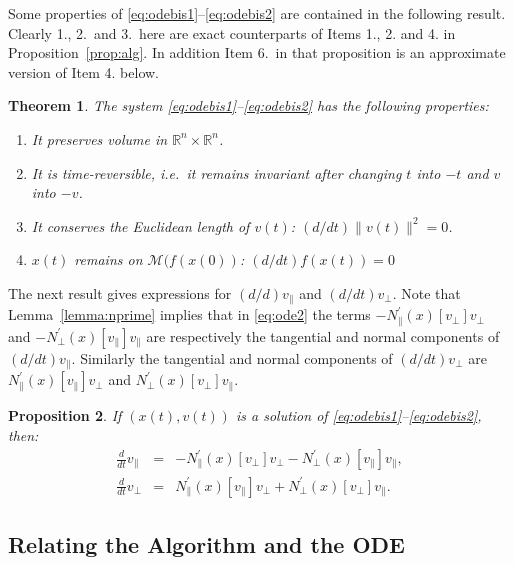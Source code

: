 \documentclass[10pt]{article}
\newcommand{\Npperp}{N^\prime_\perp}
\newcommand{\Nppar}{N^\prime_\|}
\newcommand{\bbR}{\mathbb R}
\newcommand{\vperp}{v_\perp}
\newcommand{\vpar}{v_\|}
\newtheorem{proposition}{Proposition}
\newtheorem{theorem}[proposition]{Theorem}
\begin{document}
Some properties of \eqref{eq:odebis1}--\eqref{eq:odebis2} are contained in the following result. Clearly 1., 2.\ and 3.\
here are exact counterparts of Items 1., 2. and 4. in Proposition~\ref{prop:alg}. In addition Item 6.\ in that proposition is an approximate version of Item 4. below.
\begin{theorem}\label{th:odebis}
The system \eqref{eq:odebis1}--\eqref{eq:odebis2} has the following properties:
\begin{enumerate}
\item It preserves volume in \(\bbR^n\times\bbR^n\).
\item It is time-reversible, i.e.\ it remains invariant after changing \(t\) into \(-t\) and \(v\) into \(-v\).
\item It conserves the Euclidean length of \(v(t)\): \((d/dt) \|v(t)\|^2=0\).
\item  \(x(t)\) remains on \({\mathcal M}(f(x(0))\): \((d/dt)f(x(t))=0\)
\end{enumerate}
\end{theorem}

The next result gives  expressions for \((d/d)\vpar\) and \((d/dt)\vperp\). Note that  Lemma~\ref{lemma:nprime} implies that in \eqref{eq:ode2} the terms \(- \Nppar(x)[\vperp]\vperp\)  and \(-\Npperp(x)[\vpar]\vpar\) are respectively the tangential and normal components of \((d/dt) \vpar\). Similarly the tangential and normal components of \((d/dt) \vperp\) are
\(\Nppar(x)[\vpar]\vperp\) and \(\Npperp(x)[\vperp]\vpar\).
\begin{proposition}
\label{prop:components}If \((x(t),v(t))\) is a solution of \eqref{eq:odebis1}--\eqref{eq:odebis2}, then:
\begin{eqnarray}
\label{eq:ode2}
\frac{d}{dt} \vpar &=&- \Nppar(x)[\vperp]\vperp-\Npperp(x)[\vpar]\vpar,\\
%
\label{eq:ode3}
\frac{d}{dt} \vperp &=& \Nppar(x)[\vpar]\vperp+\Npperp(x)[\vperp]\vpar.
\end{eqnarray}
\end{proposition}
\subsection{Relating the Algorithm and the ODE} \label{subsec:relation-ODE-integrator}
\end{document}
